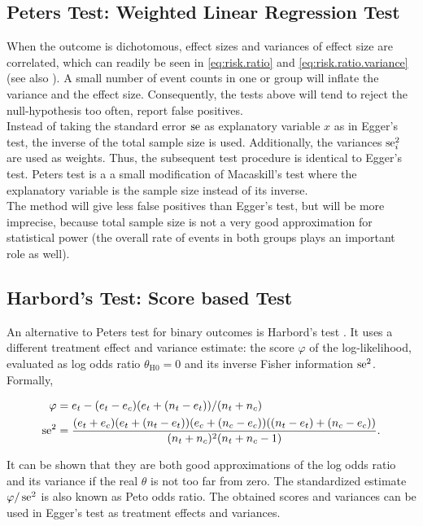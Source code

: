 \documentclass[11pt,a4paper,twoside]{book}\usepackage[]{graphicx}\usepackage[]{color}
\begin{document}
\subsection{Peters Test: Weighted Linear Regression Test} \label{sec:Peter}
When the outcome is dichotomous, effect sizes and variances of effect size are correlated, which can readily be seen in \eqref{eq:risk.ratio} and \eqref{eq:risk.ratio.variance} (see also \cite[p. 120]{meta.w.R}). A small number of event counts in one or group will inflate the variance and the effect size. Consequently, the tests above will tend to reject the null-hypothesis too often, \ie report false positives.\\ 
Instead of taking the standard error $\operatorname{se}$ as explanatory variable $x$ as in Egger's test, the inverse of the total sample size is used. Additionally, the variances $\operatorname{se}_i^2$ are used as weights. Thus, the subsequent test procedure is identical to Egger's test. Peters test is a a small modification of Macaskill's test where the explanatory variable is the sample size instead of its inverse. \\
The method will give less false positives than Egger's test, but will be more imprecise, because total sample size is not a very good approximation for statistical power (the overall rate of events in both groups plays an important role as well).



\subsection{Harbord's Test: Score based Test} \label{sec:Harbord}
An alternative to Peters test for binary outcomes is Harbord's test \citep{Harbord}.
It uses a different treatment effect and variance estimate: the score $\varphi$ of the log-likelihood, evaluated as log odds ratio $\theta_\textrm{H0} = 0$ and its inverse Fisher information $\operatorname{se}^2$. Formally,

\begin{align}
\varphi &= e_t - (e_t - e_c)(e_t + (n_t - e_t))/(n_t + n_c) \nonumber \\
 \operatorname{se}^2 &= \frac{(e_t + e_c)(e_t + (n_t - e_t))(e_c + (n_c - e_c))((n_t - e_t) + (n_c - e_c))}{(n_t + n_c)^2(n_t + n_c - 1)}. \nonumber
\end{align}

It can be shown that they are both good approximations of the log odds ratio and its variance if the real $\theta$ is not too far from zero. The standardized estimate $\varphi/\operatorname{se}^2$ is also known as Peto odds ratio. The obtained scores and variances can be used in Egger's test as treatment effects and variances.
\end{document}
